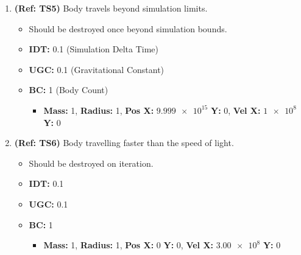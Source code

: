 \begin{enumerate}
\vspace{12pt}
\item \textbf{(Ref: TS5)} Body travels beyond simulation limits.
  \begin{itemize}
  \item Should be destroyed once beyond simulation bounds.
  \item \textbf{IDT:} 0.1 (Simulation Delta Time)
  \item \textbf{UGC:} 0.1 (Gravitational Constant)
  \item \textbf{BC:} 1 (Body Count)
    \begin{itemize}
    \item \textbf{Mass:} 1, \textbf{Radius:} 1, \textbf{Pos X:} $\num{9.999e15}$ \textbf{Y:} 0, \textbf{Vel X:} $\num{1e8}$ \textbf{Y:} 0
    \end{itemize}
  \end{itemize}
  
\vspace{12pt}
\item \textbf{(Ref: TS6)} Body travelling faster than the speed of light.
  \begin{itemize}
  \item Should be destroyed on iteration.
  \item \textbf{IDT:} 0.1
  \item \textbf{UGC:} 0.1 
  \item \textbf{BC:} 1
    \begin{itemize}
    \item \textbf{Mass:} 1, \textbf{Radius:} 1, \textbf{Pos X:} 0 \textbf{Y:} 0, \textbf{Vel X:} $\num{3.00e8}$ \textbf{Y:} 0
    \end{itemize}
  \end{itemize}  
  

\end{enumerate}
